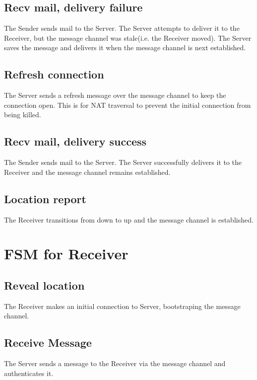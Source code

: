 \documentclass[11pt]{article}
\begin{document}
\subsection*{Recv mail, delivery failure}
The Sender sends mail to the Server. The Server attempts to deliver it to the
Receiver, but the message channel was stale(i.e. the Receiver moved). The
Server saves the message and delivers it when the message channel is next
established.
\subsection*{Refresh connection}
The Server sends a refresh message over the message channel to keep the
connection open. This is for NAT traversal to prevent the initial connection
from being killed.
\subsection*{Recv mail, delivery success}
The Sender sends mail to the Server. The Server successfully delivers it to the
Receiver and the message channel remains established.
\subsection*{Location report}
The Receiver transitions from down to up and the message channel is
established.

\pagebreak

\section*{FSM for Receiver}

\subsection*{Reveal location}
The Receiver makes an initial connection to Server, bootstraping the message
channel.
\subsection*{Receive Message}
The Server sends a message to the Receiver via the message channel and authenticates
it.
\end{document}
